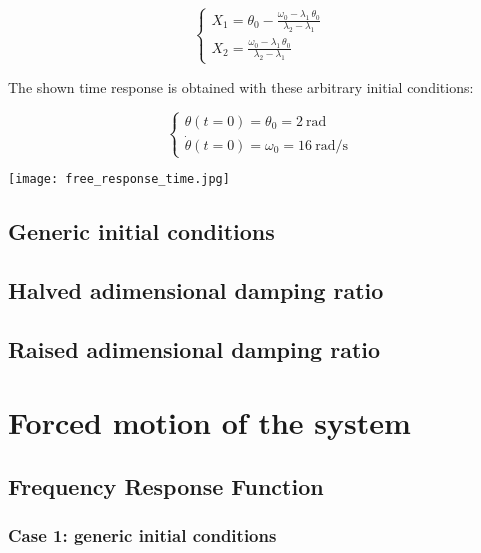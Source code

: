 \documentclass[a4paper,12pt,oneside]{article}
\begin{document}
\[
\begin{cases}
  X_1 = \theta_0 - \frac{\omega_0 - \lambda_1 \, \theta_0} %
    {\lambda_2 - \lambda_1} \\
  X_2 = \frac{\omega_0 - \lambda_1 \, \theta_0} %
    {\lambda_2 - \lambda_1}
\end{cases}
\]

The shown time response is obtained with these arbitrary initial conditions:

\[
\begin{cases}
  \theta(t=0) = \theta_0 = 2 ~ \text{rad} \\
  \dot{\theta}(t=0) = \omega_0 = 16 ~ \text{rad/s}
\end{cases}
\]

\vspace{16pt}

\texttt{[image: free\_response\_time.jpg]}

\subsection{Generic initial conditions}



\subsection{Halved adimensional damping ratio}



\subsection{Raised adimensional damping ratio}



\section{Forced motion of the system}



\subsection{Frequency Response Function}



\subsubsection*{Case 1: generic initial conditions}
\end{document}
